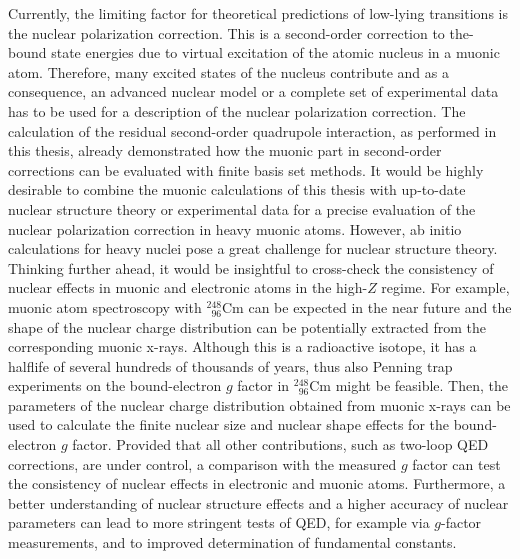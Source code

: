 Currently, the limiting factor for theoretical predictions of low-lying transitions is the nuclear polarization correction. This is a second-order correction to the-bound state energies due to virtual excitation of the atomic nucleus in a muonic atom. Therefore, many excited states of the nucleus contribute and as a consequence, an advanced nuclear model or a complete set of experimental data has to be used for a description of the nuclear polarization correction.
The calculation of the residual second-order quadrupole interaction, as performed in this thesis, already demonstrated how the muonic part in second-order corrections can be evaluated with finite basis set methods. It would be highly desirable to combine the muonic calculations of this thesis with up-to-date nuclear structure theory or experimental data for a precise evaluation of the nuclear polarization correction in heavy muonic atoms. However, ab initio calculations for heavy nuclei pose a great challenge for nuclear structure theory.\\[11pt]%
%
Thinking further ahead, it would be insightful to cross-check the consistency of nuclear effects in muonic and electronic atoms in the high-$Z$ regime. 
For example, muonic atom spectroscopy with $_{\phantom{1}96}^{248}$Cm can be expected in the near future and the shape of the nuclear charge distribution can be potentially extracted from the corresponding muonic x-rays. Although this is a radioactive isotope, it has a halflife of several hundreds of thousands of years, thus also Penning trap experiments on the bound-electron $g$ factor in $_{\phantom{1}96}^{248}$Cm might be feasible. Then, the parameters of the nuclear charge distribution obtained from muonic x-rays can be used to calculate the finite nuclear size and nuclear shape effects for the bound-electron $g$ factor. Provided that all other contributions, such as two-loop QED corrections, are under control, a comparison with the measured $g$ factor can test the consistency of nuclear effects in electronic and muonic atoms. 
Furthermore, a better understanding of nuclear structure effects and a higher accuracy of nuclear parameters can lead to more stringent tests of QED, for example via $g$-factor measurements, and to improved determination of fundamental constants.

